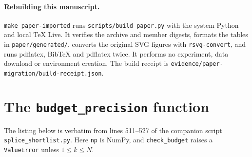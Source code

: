 \documentclass[11pt]{article}
\begin{document}
\paragraph{Rebuilding this manuscript.} \texttt{make paper-imported} runs \texttt{scripts/build\_paper.py} with the
system Python and local TeX Live. It verifies the archive and member digests, formats the tables in
\texttt{paper/generated/}, converts the original SVG figures with \texttt{rsvg-convert}, and runs
pdflatex, BibTeX and pdflatex twice. It performs no experiment, data download or environment creation. The build
receipt is \texttt{evidence/paper-migration/build-receipt.json}.

\section{The \texttt{budget\_precision} function}\label{app:code}
The listing below is verbatim from lines 511--527 of the companion script \texttt{splice\_shortlist.py}. Here
\texttt{np} is NumPy, and \texttt{check\_budget} raises a \texttt{ValueError} unless $1 \le k \le N$.

\end{document}

